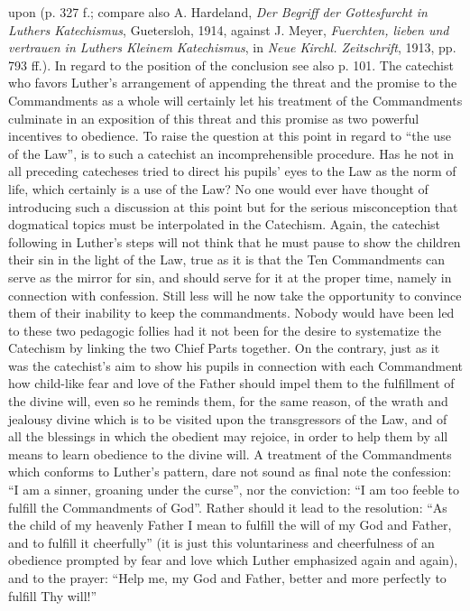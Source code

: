 upon (p. 327 f.; compare also A. Hardeland, \emph{Der Begriff der Gottesfurcht in Luthers Katechismus}, Guetersloh, 1914, against J. Meyer, \emph{Fuerchten, lieben und vertrauen in Luthers Kleinem Katechismus}, in \emph{Neue Kirchl. Zeitschrift}, 1913, pp. 793 ff.). In regard to the position of the conclusion see also p. 101. The catechist who favors Luther’s arrangement of appending the threat and the promise to the Commandments as a whole will certainly let his treatment of the Commandments culminate in an exposition of this threat and this promise as two powerful incentives to obedience. To raise the question at this point in regard to “the use of the Law”, is to such a catechist an incomprehensible procedure. Has he not in all preceding catecheses tried to direct his pupils’ eyes to the Law as the norm of life, which certainly is a use of the Law? No one would ever have thought of introducing such a discussion at this point but for the serious misconception that dogmatical topics must be interpolated in the Catechism. Again, the catechist following in Luther’s steps will not think that he must pause to show the children their sin in the light of the Law, true as it is that the Ten Commandments can serve as the mirror for sin, and should serve for it at the proper time, namely in connection with confession. Still less will he now take the opportunity to convince them of their inability to keep the commandments. Nobody would have been led to these two pedagogic follies had it not been for the desire to systematize the Catechism by linking the two Chief Parts together. On the contrary, just as it was the catechist’s aim to show his pupils in connection with each Commandment how child-like fear and love of the Father should impel them to the fulfillment of the divine will, even so he reminds them, for the same reason, of the wrath and jealousy divine which is to be visited upon the transgressors of the Law, and of all the blessings in which the obedient may rejoice, in order to help them by all means to learn obedience to the divine will. A treatment of the Commandments which conforms to Luther’s pattern, dare not sound as final note the confession: “I am a sinner, groaning under the curse”, nor the conviction: “I am too feeble to fulfill the Commandments of God”. Rather should it lead to the resolution: “As the child of my heavenly Father I mean to fulfill the will of my God and Father, and to fulfill it cheerfully” (it is just this voluntariness and cheerfulness of an obedience prompted by fear and love which Luther emphasized again and again), and to the prayer: “Help me, my God and Father, better and more perfectly to fulfill Thy will!”

